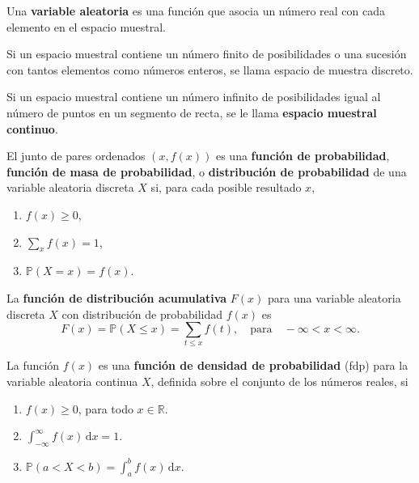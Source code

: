 \begin{definition}[]
Una \textbf{variable aleatoria} es una función que asocia un número real con cada elemento en el espacio muestral.
\end{definition}

\begin{definition}[]
Si un espacio muestral contiene un número finito de posibilidades o una sucesión con tantos elementos como  números enteros, se llama espacio de muestra discreto.
\end{definition}

\begin{definition}[]
Si un espacio muestral contiene un número infinito de posibilidades igual al número de puntos en un segmento de recta, se le llama \textbf{espacio muestral continuo}.
\end{definition}

\begin{definition}[]
El junto de pares ordenados $\left(x,f(x)\right)$ es una \textbf{función de probabilidad}, \textbf{función de masa de probabilidad}, o \textbf{distribución de probabilidad} de una variable aleatoria discreta $X$ si, para cada posible resultado $x$,
\begin{enumerate}
	\item $f(x)\ge 0$,
	\item $\displaystyle\sum_{x}f(x)=1$,
	\item $\mathds{P}\left(X=x\right)=f(x)$.
\end{enumerate}
\end{definition}

\begin{definition}[]
La \textbf{función de distribución acumulativa} $F(x)$ para una variable aleatoria discreta $X$ con distribución de probabilidad $f(x)$ es
\begin{equation*}
F(x)=\mathds{P}(X\le x)=\sum_{t\le x} f(t),\quad\text{para}\quad -\infty<x<\infty.
\end{equation*}
\end{definition}

\begin{definition}[]
La función $f(x)$ es una \textbf{función de densidad de probabilidad} (fdp) para la variable aleatoria continua $X$, definida sobre el conjunto de los números reales, si
\begin{enumerate}
	\item $f(x)\ge 0$, para todo $x\in\mathds{R}$.
	\item $\int_{-\infty}^{\infty}f(x)\,\mathrm{d}x=1$.
	\item $\mathds{P}\left(a<X<b\right)=\int_{a}^{b}f(x)\,\mathrm{d}x$.
\end{enumerate}
\end{definition}

